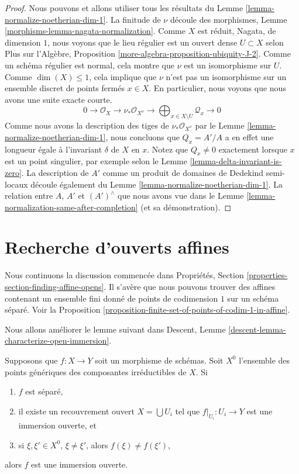 \begin{proof}
Nous pouvons et allons utiliser tous les résultats du
Lemme \ref{lemma-normalize-noetherian-dim-1}. La
finitude de $\nu$ découle des morphismes, Lemme
\ref{morphisms-lemma-nagata-normalization}. Comme $X$ est
réduit, Nagata, de dimension $1$, nous voyons que le lieu
régulier est un ouvert dense $U \subset X$ selon Plus sur
l'Algèbre, Proposition
\ref{more-algebra-proposition-ubiquity-J-2}. Comme un schéma
régulier est normal, cela montre que $\nu$ est un isomorphisme sur
$U$. Comme $\dim(X) \leq 1$, cela implique que $\nu$ n'est pas un
isomorphisme sur un ensemble discret de points fermés $x \in X$.
En particulier, nous voyons que nous avons une suite exacte courte.
$$
0 \to \mathcal{O}_X \to \nu_*\mathcal{O}_{X^\nu} \to
\bigoplus\nolimits_{x \in X \setminus U} \mathcal{Q}_x \to 0
$$
Comme nous avons la description des tiges de
$\nu_*\mathcal{O}_{X^\nu}$ par le Lemme
\ref{lemma-normalize-noetherian-dim-1}, nous concluons que $Q_x = A'/A$
a en effet une longueur égale à l'invariant $\delta$ de $X$ en $x$.
Notez que $Q_x \not = 0$ exactement lorsque $x$ est un point singulier,
par exemple selon le Lemme \ref{lemma-delta-invariant-is-zero}. La
description de $A'$ comme un produit de domaines de Dedekind semi-locaux
découle également du Lemme \ref{lemma-normalize-noetherian-dim-1}. La
relation entre $A$, $A'$ et $(A')^\wedge$ que nous avons vue dans le
Lemme \ref{lemma-normalization-same-after-completion} (et sa démonstration).
\end{proof}




\section{Recherche d'ouverts affines}
\label{section-finding-affine-opens}

\noindent
Nous continuons la discussion commencée dans Propriétés, Section
\ref{properties-section-finding-affine-opens}. Il s'avère que
nous pouvons trouver des affines contenant un ensemble fini donné
de points de codimension $1$ sur un schéma séparé. Voir la
Proposition \ref{proposition-finite-set-of-points-of-codim-1-in-affine}.

\medskip\noindent
Nous allons améliorer le lemme suivant dans Descent,
Lemme \ref{descent-lemma-characterize-open-immersion}.

\begin{lemma}
\label{lemma-characterize-open-immersion}
Supposons que $f : X \to Y$ soit un morphisme de schémas. Soit $X^0$
l'ensemble des points génériques des composantes irréductibles de $X$. Si
\begin{enumerate}
\item $f$ est séparé, \item il existe un recouvrement
ouvert $X = \bigcup U_i$ tel que $f|_{U_i} : U_i \to Y$
est une immersion ouverte, et \item si $\xi, \xi' \in
X^0$, $\xi \not = \xi'$, alors $f(\xi) \not = f(\xi')$,
\end{enumerate}
alors $f$ est une immersion ouverte.
\end{lemma}

